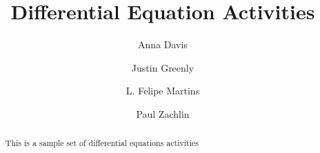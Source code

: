 \documentclass{xourse}
\author{Anna Davis \and Justin Greenly \and L. Felipe Martins \and Paul Zachlin}
\title{Differential Equation Activities} \license{CC-BY 4.0}
\begin{document}
\begin{abstract}
 This is a sample set of differential equations activities
\end{abstract}
\maketitle

\end{document}

